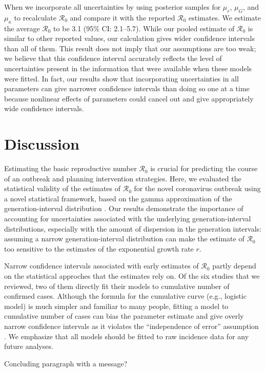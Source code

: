 \documentclass[12pt]{article}
\begin{document}
When we incorporate all uncertainties by using posterior samples for $\mu_r$, $\mu_G$, and $\mu_\kappa$ to recalculate $\mathcal R_0$ and compare it with the reported $\mathcal R_0$ estimates.
We estimate the average $\mathcal R_0$ to be 3.1 (95\% CI: 2.1--5.7).
While our pooled estimate of $\mathcal R_0$ is similar to other reported values, our calculation gives wider confidence intervals than all of them.
This result does not imply that our assumptions are too weak;
we believe that this confidence interval accurately reflects the level of uncertainties present in the information that were available when these models were fitted.
In fact, our results show that incorporating uncertainties in all parameters can give narrower confidence intervals than doing so one at a time because nonlinear effects of parameters could cancel out and give appropriately wide confidence intervals.

\section{Discussion}

Estimating the basic reproductive number $\mathcal R_0$ is crucial for predicting the course of an outbreak and planning intervention strategies.
Here, we evaluated the statistical validity of the estimates of $\mathcal R_0$ for the novel coronavirus outbreak using a novel statistical framework, based on the gamma approximation of the generation-interval distribution \citep{park2019practical}.
Our results demonstrate the importance of accounting for uncertainties associated with the underlying generation-interval distributions, especially with the amount of dispersion in the generation intervals:
assuming a narrow generation-interval distribution can make the estimate of $\mathcal R_0$ too sensitive to the estimates of the exponential growth rate $r$.

Narrow confidence intervals associated with early estimates of $\mathcal R_0$ partly depend on the statistical approches that the estimates rely on.
Of the six studies that we reviewed, two of them directly fit their models to cumulative number of confirmed cases.
Although the formula for the cumulative curve (e.g., logistic model) is much simpler and familiar to many people, 
fitting a model to cumulative number of cases can bias the parameter estimate and give overly narrow confidence intervals as it violates the ``independence of error'' assumption \citep{ma2014estimating, king2015avoidable}.
We emphasize that all models should be fitted to raw incidence data for any future analyses.



Concluding paragraph with a message?


\pagebreak


\end{document}

